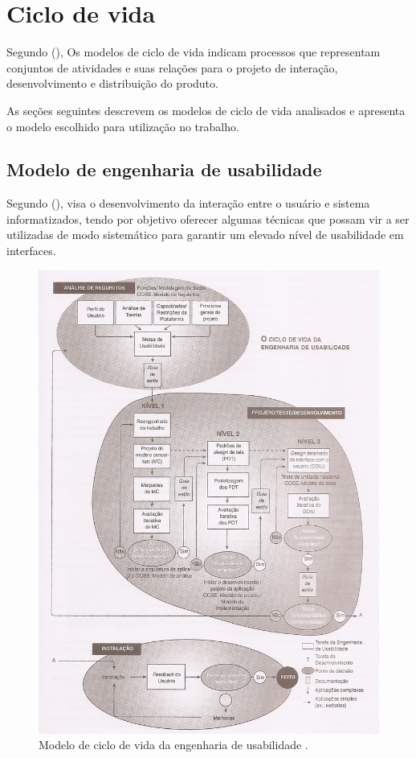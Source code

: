 \chapter{Ciclo de vida}

  Segundo \citeauthor{ihc} (\citeyear{ihc}), Os modelos de ciclo de vida indicam processos que representam conjuntos
  de atividades e suas relações para o projeto de interação, desenvolvimento e distribuição do produto.
  
  As seções seguintes descrevem os modelos de ciclo de vida analisados e apresenta o modelo escolhido para utilização no trabalho.

  \section{Modelo de engenharia de usabilidade}
  
  Segundo \citeauthor{engusabilidade} (\citeyear{engusabilidade}), visa o desenvolvimento da interação entre o usuário e
  sistema informatizados, tendo por objetivo oferecer algumas técnicas 
  que possam vir a ser utilizadas de modo sistemático para garantir um elevado nível de usabilidade em interfaces. 
  
  \begin{figure}[!htb]
  \centering
  \includegraphics[scale=0.55, angle=90]{figuras/ciclovidaengusabilidade.jpg}
  \caption{Modelo de ciclo de vida da engenharia de usabilidade \cite{ciclovidaengdeusabilidade}.}
  \end{figure}
  
